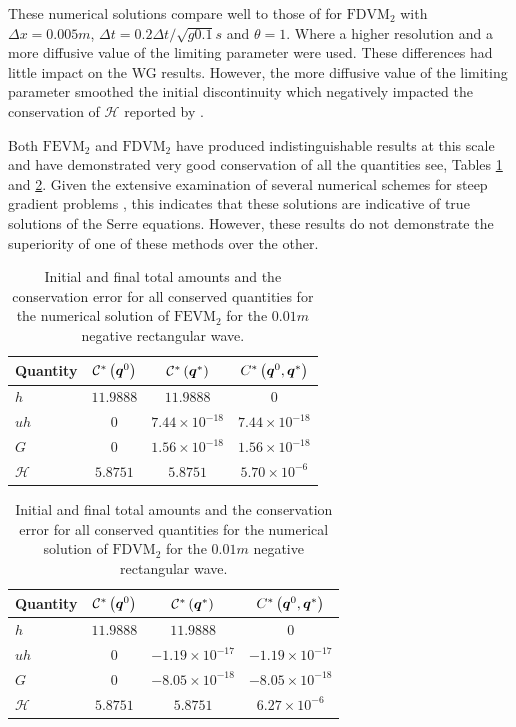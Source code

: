 These numerical solutions compare well to those of \citet{Zoppou-etal-2017} for $\text{FDVM}_2$ with $\Delta x = 0.005m$, $\Delta t = 0.2 \Delta t / \sqrt{g 0.1} s$ and $\theta = 1$. Where a higher resolution and a more diffusive value of the limiting parameter were used. These differences had little impact on the WG results. However, the more diffusive value of the limiting parameter smoothed the initial discontinuity which negatively impacted the conservation of $\mathcal{H}$ reported by \citet{Zoppou-etal-2017}.

Both $\text{FEVM}_2$ and $\text{FDVM}_2$ have produced indistinguishable results at this scale and have demonstrated very good conservation of all the quantities see, Tables \ref{tab:ConservationSegurFEVM1cm} and \ref{tab:ConservationSegurFDVM1cm}. Given the extensive examination of several numerical schemes for steep gradient problems \cite{Pitt-2018-61}, this indicates that these solutions are indicative of true solutions of the Serre equations. However, these results do not demonstrate the superiority of one of these methods over the other. 
%
\begin{table}
	\centering
	\begin{tabular}{l  c  c c}
		Quantity& $\mathcal{C}^*\left(\boldsymbol{q}^0\right)$ & $\mathcal{C}^*\left(\boldsymbol{q}^*\right)$ & ${C}^*\left(\boldsymbol{q}^0,\boldsymbol{q}^*\right)$ \B\\
		\hline
		$h$ & $11.9888$ & $11.9888$ & $0$ \T\\
		$uh$ & $0$ & $7.44 \times 10^{-18}$ & $7.44 \times 10^{-18}$\\
		$G$ & $0$ & $1.56\times 10^{-18}$ & $1.56\times 10^{-18}$\\
		$\mathcal{H}$ & $5.8751$ & $5.8751$ & $5.70 \times 10^{-6}$ \B \\
		\hline
	\end{tabular}
	\caption{Initial and final total amounts and the conservation error for all conserved quantities for the numerical solution of $\text{FEVM}_2$ for the $0.01m$ negative rectangular wave.}
	\label{tab:ConservationSegurFEVM1cm}
\end{table} 
%
\begin{table}
	\centering
	\begin{tabular}{l  c  c c}
		Quantity& $\mathcal{C}^*\left(\boldsymbol{q}^0\right)$ & $\mathcal{C}^*\left(\boldsymbol{q}^*\right)$ & ${C}^*\left(\boldsymbol{q}^0,\boldsymbol{q}^*\right)$ \B \\
		\hline
		$h$ & $11.9888$ & $11.9888$ & $0$ \T\\
		$uh$ & $0$ & $-1.19 \times 10^{-17}$ & $-1.19 \times 10^{-17}$\\
		$G$ & $0$ & $-8.05\times 10^{-18}$ & $-8.05\times 10^{-18}$\\
		$\mathcal{H}$ & $5.8751$ & $5.8751$ & $6.27 \times 10^{-6}$ \B\\
		\hline
	\end{tabular}
	\caption{Initial and final total amounts and the conservation error for all conserved quantities for the numerical solution of $\text{FDVM}_2$ for the $0.01m$ negative rectangular wave.}
	\label{tab:ConservationSegurFDVM1cm}
\end{table}  
 

